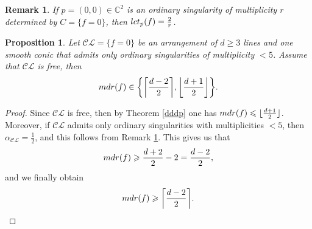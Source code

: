 \documentclass[10pt,a4paper]{amsart}
\newtheorem{remark}{Remark}
\newtheorem{proposition}{Proposition}
\renewcommand\geq{\geqslant}
\renewcommand\leq{\leqslant}
\begin{document}
\begin{remark}
\label{lct}
If $p=(0,0) \in \mathbb{C}^{2}$ is an ordinary singularity of multiplicity $r$ determined by $C = \{ f=0\}$, then ${\rm lct}_{p}(f) = \frac{2}{r}$.
\end{remark}

\begin{proposition}
Let $\mathcal{CL} = \{f=0\}$ be an arrangement of $d\geq 3$ lines and one smooth conic that admits only ordinary singularities of multiplicity $<5$. Assume that $\mathcal{CL}$ is free, then
$${\rm mdr}(f) \in \bigg\{\bigg\lceil \frac{d-2}{2} \bigg\rceil, \bigg\lfloor \frac{d+1}{2} \bigg \rfloor \bigg\}.$$
\end{proposition}

\begin{proof}
Since $\mathcal{CL}$ is free, then by Theorem \ref{dddp} one has ${\rm mdr}(f) \leq \lfloor \frac{d+1}{2} \rfloor$. Moreover, if $\mathcal{CL}$ admits only ordinary singularities with multiplicities $<5$, then $\alpha_{\mathcal{CL}} = \frac{1}{2}$, and this follows from Remark \ref{lct}. This gives us that
$${\rm mdr}(f) \geq \frac{d+2}{2} - 2 = \frac{d-2}{2},$$
and we finally obtain
$${\rm mdr}(f)\geq \bigg\lceil \frac{d-2}{2} \bigg\rceil.$$
\end{proof}
\end{document}
